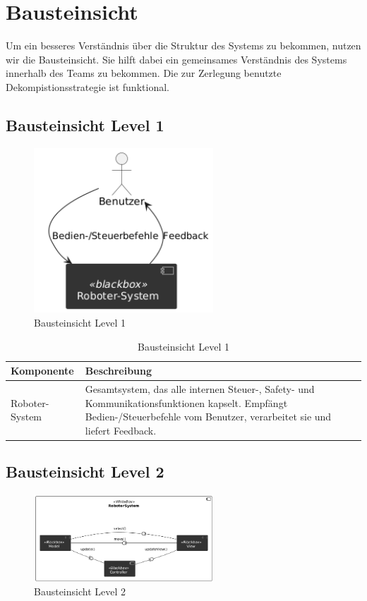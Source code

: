 \chapter{Bausteinsicht}

Um ein besseres Verständnis über die Struktur des Systems zu bekommen, nutzen wir die Bausteinsicht. Sie hilft dabei ein gemeinsames Verständnis des Systems innerhalb des Teams zu bekommen.
Die zur Zerlegung benutzte Dekompistionsstrategie ist funktional. 

\section{Bausteinsicht Level 1}
 

\begin{figure}[h] %
    \centering
    \includegraphics[width=0.6\textwidth]{diagrams/baustein_lvl_1_updated.png}
    \caption{Bausteinsicht Level 1}
\end{figure}

\begin{table}[h!]
\centering
\begin{tabular}{|p{4cm}|p{9cm}|}
\hline
\textbf{Komponente} & \textbf{Beschreibung} \\ \hline
Roboter-System & Gesamtsystem, das alle internen Steuer-, Safety- und Kommunikations­funktionen kapselt. Empfängt Bedien-/Steuerbefehle vom Benutzer, verarbeitet sie und liefert Feedback. \\ \hline
\end{tabular}
\caption{Bausteinsicht Level 1}
\label{tab:lvl1}
\end{table}

\newpage
\section{Bausteinsicht Level 2}
\begin{figure}[h] %
    \centering
    \includegraphics[width=0.6\textwidth]{diagrams/baustein_lvl_2_updated.png}
    \caption{Bausteinsicht Level 2}
\end{figure}

